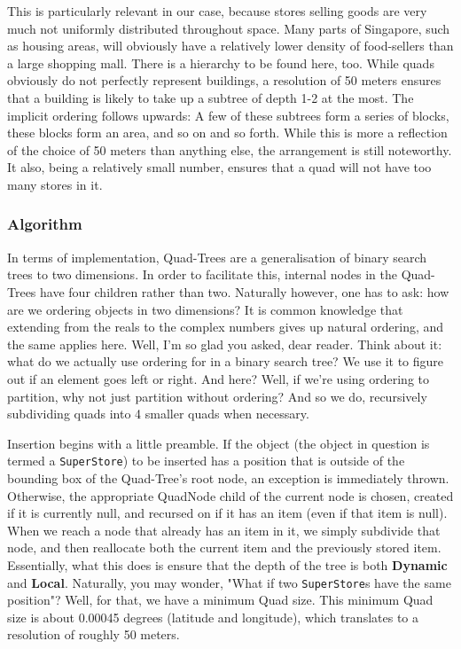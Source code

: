 \documentclass[12pt]{article}
\begin{document}
{This is particularly relevant in our case, because stores selling goods are very much not uniformly distributed throughout space. Many parts of Singapore, such as housing areas, will obviously have a relatively lower density of food-sellers than a large shopping mall. There is a hierarchy to be found here, too. While quads obviously do not perfectly represent buildings, a resolution of 50 meters ensures that a building is likely to take up a subtree of depth 1-2 at the most. The implicit ordering follows upwards: A few of these subtrees form a series of blocks, these blocks form an area, and so on and so forth. While this is more a reflection of the choice of 50 meters than anything else, the arrangement is still noteworthy. It also, being a relatively small number, ensures that a quad will not have too many stores in it.

\subsubsection{Algorithm}

In terms of implementation, Quad-Trees are a generalisation of binary search trees to two dimensions. In order to facilitate this, internal nodes in the Quad-Trees have four children rather than two. Naturally however, one has to ask: how are we ordering objects in two dimensions? It is common knowledge that extending from the reals to the complex numbers gives up natural ordering, and the same applies here. Well, I'm so glad you asked, dear reader. Think about it: what do we actually use ordering for in a binary search tree? We use it to figure out if an element goes left or right. And here? Well, if we're using ordering to partition, why not just partition without ordering? And so we do, recursively subdividing quads into 4 smaller quads when necessary.

Insertion begins with a little preamble. If the object (the object in question is termed a \texttt{SuperStore}) to be inserted has a position that is outside of the bounding box of the Quad-Tree's root node, an exception is immediately thrown. Otherwise, the appropriate QuadNode child of the current node is chosen, created if it is currently null, and recursed on if it has an item (even if that item is null). When we reach a node that already has an item in it, we simply subdivide that node, and then reallocate both the current item and the previously stored item. Essentially, what this does is ensure that the depth of the tree is both \textbf{Dynamic} and \textbf{Local}. Naturally, you may wonder, "What if two \texttt{SuperStore}s have the same position"? Well, for that, we have a minimum Quad size. This minimum Quad size is about 0.00045 degrees (latitude and longitude), which translates to a resolution of roughly 50 meters.

}
\end{document}

